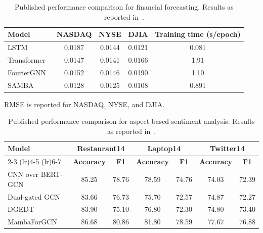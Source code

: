 \documentclass[acmsmall]{acmart}
\begin{document}
\begin{table}[h]
\centering
\caption{
Published performance comparison for financial forecasting.
Results as reported in~\cite{mehrabian2024mamba}.
}
\label{tab:FMcomparison}
\scriptsize

\begin{tabular}{lcccc}
\toprule
\textbf{Model} &
\textbf{NASDAQ} &
\textbf{NYSE} &
\textbf{DJIA} &
\textbf{Training time (s/epoch)} \\
\midrule

LSTM~\cite{moghar2020stock}
& 0.0187 & 0.0144 & 0.0121 & 0.081 \\

Transformer~\cite{wang2022stock}
& 0.0147 & 0.0141 & 0.0166 & 1.91 \\

FourierGNN~\cite{yi2024fouriergnn}
& 0.0152 & 0.0146 & 0.0190 & 1.10 \\

\rowcolor{lightgray}
SAMBA~\cite{mehrabian2024mamba}
& 0.0128 & 0.0125 & 0.0108 & 0.891 \\

\bottomrule
\end{tabular}
\vspace{0.5mm}

{\footnotesize RMSE is reported for NASDAQ, NYSE, and DJIA.}
\end{table}

\begin{table}[h]
\centering
\caption{
Published performance comparison for aspect-based sentiment analysis.
Results as reported in~\cite{lawan2024mambaforgcn}.
}
\label{tab:SAperformance}
\scriptsize
\begin{tabular}{lcccccc}
\toprule
\multirow{2}{*}{\textbf{Model}} &
\multicolumn{2}{c}{\textbf{Restaurant14}} &
\multicolumn{2}{c}{\textbf{Laptop14}} &
\multicolumn{2}{c}{\textbf{Twitter14}} \\
\cmidrule(lr){2-3}
\cmidrule(lr){4-5}
\cmidrule(lr){6-7}
&
\textbf{Accuracy} & \textbf{F1} &
\textbf{Accuracy} & \textbf{F1} &
\textbf{Accuracy} & \textbf{F1} \\
\midrule

CNN over BERT-GCN~\cite{phan2022aspect}
& 85.25 & 78.76
& 78.59 & 74.76
& 74.03 & 72.39 \\

Dual-gated GCN~\cite{liu2023enhancing}
& 83.66 & 76.73
& 75.70 & 72.57
& 74.87 & 72.27 \\

DGEDT~\cite{tang2020dependency}
& 83.90 & 75.10
& 76.80 & 72.30
& 74.80 & 73.40 \\

\rowcolor{lightgray}
MambaForGCN~\cite{lawan2024mambaforgcn}
& 86.68 & 80.86
& 81.80 & 78.59
& 77.67 & 76.88 \\

\bottomrule
\end{tabular}
\end{table}
\end{document}
